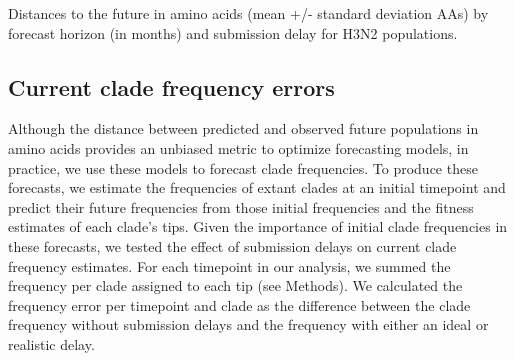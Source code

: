 \documentclass[9pt,lineno]{elife}
\begin{document}
\begin{table}[htb]
  \begin{center}
    
    \caption{Distances to the future in amino acids (mean +/- standard deviation AAs) by forecast horizon (in months) and submission delay for H3N2 populations.}
    \label{tab:h3n2_distances_to_the_future}
  \end{center}
\end{table}

\subsection{Current clade frequency errors}

Although the distance between predicted and observed future populations in amino acids provides an unbiased metric to optimize forecasting models, in practice, we use these models to forecast clade frequencies.
To produce these forecasts, we estimate the frequencies of extant clades at an initial timepoint and predict their future frequencies from those initial frequencies and the fitness estimates of each clade's tips.
Given the importance of initial clade frequencies in these forecasts, we tested the effect of submission delays on current clade frequency estimates.
For each timepoint in our analysis, we summed the frequency per clade assigned to each tip (see Methods).
We calculated the frequency error per timepoint and clade as the difference between the clade frequency without submission delays and the frequency with either an ideal or realistic delay.
\end{document}
